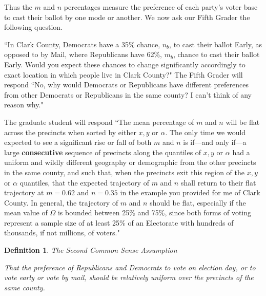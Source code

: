 \documentclass[preprint,13pt]{elsarticle}
\newtheorem{definition}{Definition}[section]
\begin{document}
Thus the $m$ and $n$ percentages measure the preference of each party's voter base to cast their ballot by one mode or another. We now ask our Fifth Grader the following question.

``In Clark County, Democrats have a 35\% chance, $n_{b}$, to cast their ballot Early, as opposed to by Mail, where Republicans have 62\%, $m_{b}$, chance to cast their ballot Early. Would you expect these chances to change significantly accordingly to exact location in which people live in Clark County?" The Fifth Grader will respond ``No, why would Democrats or Republicans have different preferences from other Democrats or Republicans in the same county? I can't think of any reason why."

The graduate student will respond ``The mean percentage of $m$ and $n$ will be flat across the precincts when sorted by either $x,y$ or $\alpha$. The only time we would expected to see a significant rise or fall of both $m$ and $n$ is if---and only if---a large \textbf{consecutive} sequence of precincts along the quantiles of $x,y$ or $\alpha$ had a uniform and wildly different geography or demographic from the other precincts in the same county, and such that, when the precincts exit this region of the $x,y$ or $\alpha$ quantiles, that the expected trajectory of $m$ and $n$ shall return to their flat trajectory at $m=0.62$ and $n=0.35$ in the example you provided for me of Clark County. In general, the trajectory of $m$ and $n$ should be flat, especially if the mean value of $\Omega$ is bounded between 25\% and 75\%, since both forms of voting represent a sample size of at least 25\% of an Electorate with hundreds of thousands, if not millions, of voters."

\begin{definition}{The Second Common Sense Assumption}

That the preference of Republicans and Democrats to vote on election day, or to vote early or vote by mail, should be relatively uniform over the precincts of the same county.
\end{definition}
\end{document}
